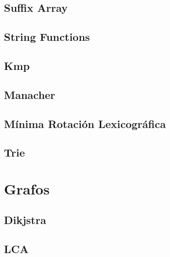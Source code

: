 \documentclass[a4paper,11pt,landscape,twocolumn]{article}
\begin{document}


\subsection{Suffix Array}



\subsection{String Functions}



\subsection{Kmp}



\subsection{Manacher}



\subsection{Mínima Rotación Lexicográfica}



\subsection{Trie}



\section{Grafos}

\subsection{Dikjstra}



\subsection{LCA}
\end{document}
